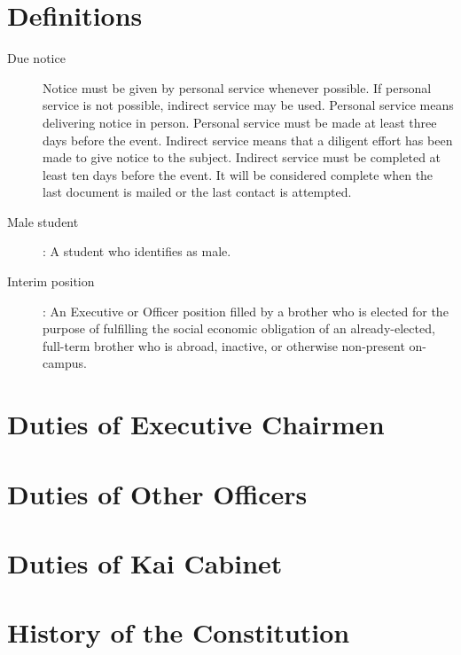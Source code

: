 \chapter{Definitions}
\label{app:definitions}

\begin{description}
	\item [Due notice] Notice must be given by personal service whenever
		possible.
		If personal service is not possible, indirect service may be used.
		Personal service means delivering notice in person.
		Personal service must be made at least three days before the event.
		Indirect service means that a diligent effort has been made to give
		notice to the subject.
		Indirect service must be completed at least ten days before the event.
		It will be considered complete when the last document is mailed or the
		last contact is attempted.
	\item [Male student]: A student who identifies as male.
	\item [Interim position]: An Executive or Officer position
		filled by a brother who is elected for the purpose of fulfilling the
		social economic obligation of an already-elected, full-term brother who
		is abroad, inactive, or otherwise non-present on-campus.
\end{description}

\chapter{Duties of Executive Chairmen}
\label{app:duties-of-executive-chairmen}

\chapter{Duties of Other Officers}
\label{app:duties-of-other-officers}

\chapter{Duties of Kai Cabinet}
\label{app:duties-of-kai-cabinet}

\chapter{History of the Constitution}
\label{app:history-of-the-constitution}
